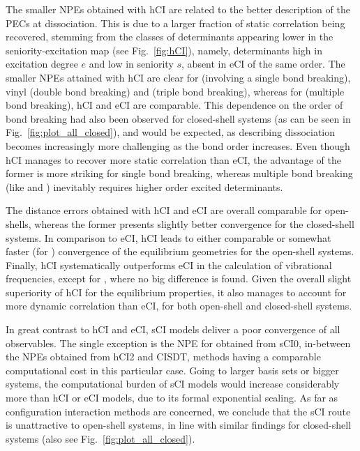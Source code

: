 \documentclass[aip,jcp,reprint,noshowkeys,superscriptaddress]{revtex4-1}
\begin{document}
The smaller NPEs obtained with hCI are related to the better description of the PECs at dissociation.
This is due to a larger fraction of static correlation being recovered,
stemming from the classes of determinants appearing lower in the seniority-excitation map (see Fig.~\ref{fig:hCI}),
namely, determinants high in excitation degree $e$ and low in seniority $s$, absent in eCI of the same order.
The smaller NPEs attained with hCI are clear for  (involving a single bond breaking), 
vinyl (double bond breaking) and  (triple bond breaking),
whereas for  (multiple bond breaking), hCI and eCI are comparable.
This dependence on the order of bond breaking had also been observed for closed-shell systems \cite{Kossoski_2022} (as can be seen in Fig.~\ref{fig:plot_all_closed}),
and would be expected, as describing dissociation becomes increasingly more challenging as the bond order increases.
Even though hCI manages to recover more static correlation than eCI,
the advantage of the former is more striking for single bond breaking, whereas multiple bond breaking (like  and ) inevitably requires higher order excited determinants.
 
The distance errors obtained with hCI and eCI are overall comparable for open-shells, whereas the former presents slightly better convergence for the closed-shell systems.
In comparison to eCI, hCI leads to either comparable or somewhat faster (for ) convergence of the equilibrium geometries for the open-shell systems.
Finally, hCI systematically outperforms eCI in the calculation of vibrational frequencies, except for , where no big difference is found.
Given the overall slight superiority of hCI for the equilibrium properties, it also manages to account for more dynamic correlation than eCI,
for both open-shell and closed-shell systems.

In great contrast to hCI and eCI, sCI models deliver a poor convergence of all observables.
The single exception is the NPE for  obtained from sCI0, in-between the NPEs obtained from hCI2 and CISDT, methods having a comparable computational cost in this particular case.
Going to larger basis sets or bigger systems, the computational burden of sCI models would increase considerably more than hCI or eCI models, 
due to its formal exponential scaling.
As far as configuration interaction methods are concerned, we conclude that the sCI route is unattractive to open-shell systems,
in line with similar findings for closed-shell systems \cite{Kossoski_2022} (also see Fig.~\ref{fig:plot_all_closed}).
\end{document}
